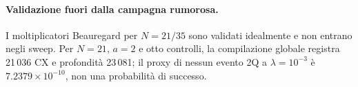 \begin{onehalfspace}
\paragraph{Validazione fuori dalla campagna rumorosa.}
I moltiplicatori Beauregard per $N=21/35$ sono validati idealmente e non
entrano negli sweep. Per $N=21$, $a=2$ e otto controlli, la compilazione
globale registra 21\,036 CX e profondità 23\,081; il proxy di nessun
evento 2Q a $\lambda=10^{-3}$ è $7.2379\times10^{-10}$, non una
probabilità di successo.

\end{onehalfspace}
